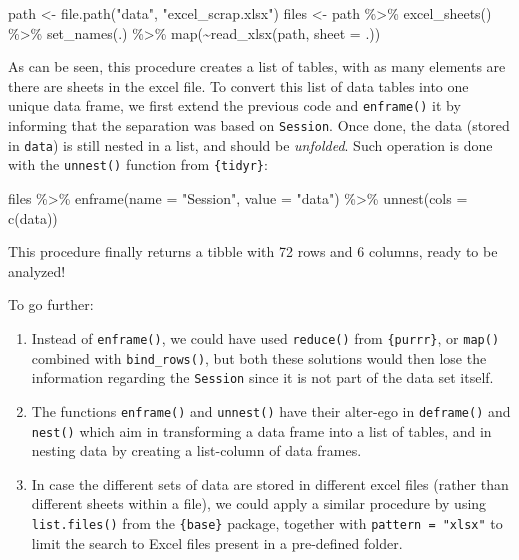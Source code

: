 \documentclass[
]{book}
\newenvironment{Shaded}{\begin{snugshade}}{\end{snugshade}}
\newcommand{\AttributeTok}[1]{\textcolor[rgb]{0.77,0.63,0.00}{#1}}
\newcommand{\FunctionTok}[1]{\textcolor[rgb]{0.00,0.00,0.00}{#1}}
\newcommand{\NormalTok}[1]{#1}
\newcommand{\OtherTok}[1]{\textcolor[rgb]{0.56,0.35,0.01}{#1}}
\newcommand{\SpecialCharTok}[1]{\textcolor[rgb]{0.00,0.00,0.00}{#1}}
\newcommand{\StringTok}[1]{\textcolor[rgb]{0.31,0.60,0.02}{#1}}
\providecommand{\tightlist}{%
  \setlength{\itemsep}{0pt}\setlength{\parskip}{0pt}}
\begin{document}
\begin{Shaded}
\begin{Highlighting}[]
\NormalTok{path }\OtherTok{\textless{}{-}} \FunctionTok{file.path}\NormalTok{(}\StringTok{"data"}\NormalTok{, }\StringTok{"excel\_scrap.xlsx"}\NormalTok{) }
\NormalTok{files }\OtherTok{\textless{}{-}}\NormalTok{ path }\SpecialCharTok{\%\textgreater{}\%} 
  \FunctionTok{excel\_sheets}\NormalTok{() }\SpecialCharTok{\%\textgreater{}\%} 
  \FunctionTok{set\_names}\NormalTok{(.) }\SpecialCharTok{\%\textgreater{}\%} 
  \FunctionTok{map}\NormalTok{(}\SpecialCharTok{\textasciitilde{}}\FunctionTok{read\_xlsx}\NormalTok{(path, }\AttributeTok{sheet =}\NormalTok{ .))}
\end{Highlighting}
\end{Shaded}

As can be seen, this procedure creates a list of tables, with as many elements are there are sheets in the excel file. To convert this list of data tables into one unique data frame, we first extend the previous code and \texttt{enframe()} it by informing that the separation was based on \texttt{Session}. Once done, the data (stored in \texttt{data}) is still nested in a list, and should be \emph{unfolded}. Such operation is done with the \texttt{unnest()} function from \texttt{\{tidyr\}}:

\begin{Shaded}
\begin{Highlighting}[]
\NormalTok{files }\SpecialCharTok{\%\textgreater{}\%} 
  \FunctionTok{enframe}\NormalTok{(}\AttributeTok{name =} \StringTok{"Session"}\NormalTok{, }\AttributeTok{value =} \StringTok{"data"}\NormalTok{) }\SpecialCharTok{\%\textgreater{}\%} 
  \FunctionTok{unnest}\NormalTok{(}\AttributeTok{cols =} \FunctionTok{c}\NormalTok{(data))}
\end{Highlighting}
\end{Shaded}

This procedure finally returns a tibble with 72 rows and 6 columns, ready to be analyzed!

To go further:

\begin{enumerate}
\def\labelenumi{\arabic{enumi}.}
\tightlist
\item
  Instead of \texttt{enframe()}, we could have used \texttt{reduce()} from \texttt{\{purrr\}}, or \texttt{map()} combined with \texttt{bind\_rows()}, but both these solutions would then lose the information regarding the \texttt{Session} since it is not part of the data set itself.
\item
  The functions \texttt{enframe()} and \texttt{unnest()} have their alter-ego in \texttt{deframe()} and \texttt{nest()} which aim in transforming a data frame into a list of tables, and in nesting data by creating a list-column of data frames.
\item
  In case the different sets of data are stored in different excel files (rather than different sheets within a file), we could apply a similar procedure by using \texttt{list.files()} from the \texttt{\{base\}} package, together with \texttt{pattern\ =\ "xlsx"} to limit the search to Excel files present in a pre-defined folder.
\end{enumerate}
\end{document}
